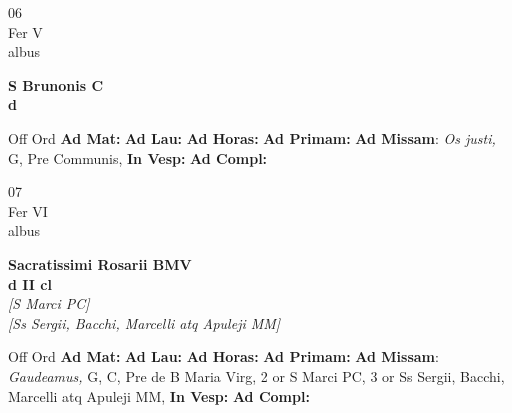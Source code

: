\documentclass[10pt, openany]{book}
\begin{document}
    \begin{center}
        \begin{minipage}{3.5in}
            \vspace{2em}
            \begin{minipage}{0.5in}
                {\Huge 06} \\
                {\normalsize Fer V} \\
                {\normalsize albus}
            \end{minipage}
            \begin{minipage}{3.0in}
                \textbf{ \large S Brunonis C \\
                \textnormal{\normalsize d}} \\ 
            \end{minipage}
            \begin{justify}Off Ord
                \textbf{Ad Mat: }
                \textbf{Ad Lau: }
                \textbf{Ad Horas: }
                \textbf{Ad Primam: }\textbf{Ad Missam}: \textit{Os justi,} G, Pre Communis,  
                \textbf{In Vesp: }
                \textbf{Ad Compl: }
            \end{justify}
        \end{minipage}
    \end{center}

    \begin{center}
        \begin{minipage}{3.5in}
            \vspace{2em}
            \begin{minipage}{0.5in}
                {\Huge 07} \\
                {\normalsize Fer VI} \\
                {\normalsize albus}
            \end{minipage}
            \begin{minipage}{3.0in}
                \textbf{ \large Sacratissimi Rosarii BMV \\
                \textnormal{\normalsize d II cl}} \\ \textit{[S Marci PC]} \\ \textit{[Ss Sergii, Bacchi, Marcelli atq Apuleji MM]} \\ 
            \end{minipage}
            \begin{justify}Off Ord
                \textbf{Ad Mat: }
                \textbf{Ad Lau: }
                \textbf{Ad Horas: }
                \textbf{Ad Primam: }\textbf{Ad Missam}: \textit{Gaudeamus,} G, C, Pre de B Maria Virg, 2 or S Marci PC, 3 or Ss Sergii, Bacchi, Marcelli atq Apuleji MM,  
                \textbf{In Vesp: }
                \textbf{Ad Compl: }
            \end{justify}
        \end{minipage}
    \end{center}
\end{document}
